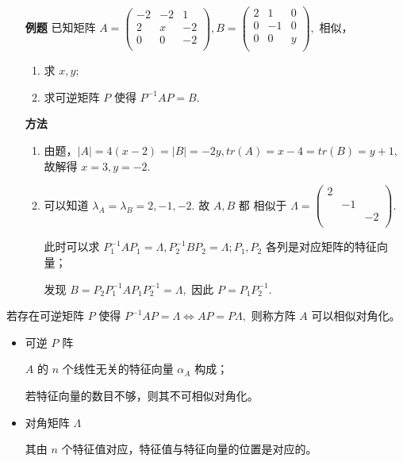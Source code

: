 \begin{itemize}
    \item[\textbf{例题}] 已知矩阵 $ A = \begin{pmatrix}
        -2&-2&1\\2&x&-2\\0&0&-2\\
    \end{pmatrix},B = \begin{pmatrix}
        2&1&0\\0&-1&0\\0&0&y\\
    \end{pmatrix}, $ 相似，
    \begin{enumerate}[label = \Roman*.]
        \item 求 $ x,y; $ 
        \item 求可逆矩阵 $ P $ 使得 $ P^{-1}AP = B. $ 
    \end{enumerate}
    \item[\textbf{方法}] 
    \begin{enumerate}[label = \Roman*.]
        \item 由题，$ |A| = 4(x-2) = |B| = -2y, tr(A) = x - 4 = tr(B) = y + 1, $ 
        故解得 $ x = 3,y = -2. $ 
        \item 可以知道 $ \lambda_A = \lambda_B = 2,-1,-2. $ 故 $ A,B $ 都
        相似于 $ \Lambda = \begin{pmatrix}
            2&&\\&-1&\\&&-2\\
        \end{pmatrix}. $ 
        
        此时可以求 $ P_1^{-1}AP_1 = \Lambda,P_2^{-1}BP_2 = \Lambda; P_1,P_2$  
        各列是对应矩阵的特征向量；

        发现 $ B = P_2P_1^{-1}AP_1P_2^{-1} = \Lambda, $ 
        因此 $ P = P_1P_2^{-1}. $ 
    \end{enumerate}
\end{itemize}



若存在可逆矩阵 $ P $ 使得 $ P^{-1}AP = \Lambda \Leftrightarrow AP = P\Lambda, $ 
则称方阵 $ A $ 可以相似对角化。


\begin{itemize}
    \item 可逆 $ P $ 阵
    
    $ A $ 的 $ n $ 个线性无关的特征向量 $ \alpha_A $ 构成；
    
    若特征向量的数目不够，则其不可相似对角化。
    \item 对角矩阵 $ \Lambda $
    
    其由 $ n $ 个特征值对应，特征值与特征向量的位置是对应的。
\end{itemize}

